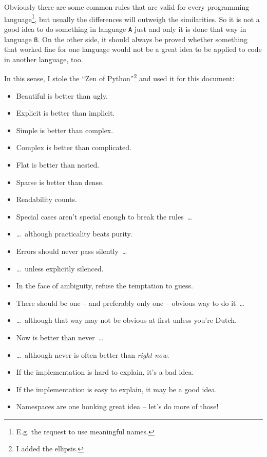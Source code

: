\documentclass[11pt,a4paper, titlepage, parskip=half, headsepline, footsepline, cleardoublepage=current, headheight=1cm]{scrbook}
\begin{document}
Obviously there are some common rules that are valid for every programming language\footnote{E.g. the request to use meaningful names.}, but usually the differences will outweigh the similarities. So it is not a good idea to do something in language \verb#A# just and only it is done that way in language \verb#B#. On the other side, it should always be proved whether something that worked fine for one language would not be a great idea to be applied to code in another language, too.

In this sense, I stole the “Zen of Python”\autocite{WIKIPEDIA:ZenOfPython,PYTHON_ORG_MAILING_LIST:ThePythonWay}\footnote{I added the ellipsis.} and used it for this document:

\begin{itemize}[nosep]
	\item Beautiful is better than ugly.
	\item Explicit is better than implicit.
	\item Simple is better than complex.
	\item Complex is better than complicated.
	\item Flat is better than nested.
	\item Sparse is better than dense.
	\item Readability counts.
	\item Special cases aren't special enough to break the rules~…
	\item …~although practicality beats purity.
	\item Errors should never pass silently~…
	\item …~unless explicitly silenced.
	\item In the face of ambiguity, refuse the temptation to guess.
	\item There should be one – and preferably only one – obvious way to do it~…
	\item …~although that way may not be obvious at first unless you're Dutch.
	\item Now is better than never~…
	\item …~although never is often better than \textit{right now}.
	\item If the implementation is hard to explain, it's a bad idea.
	\item If the implementation is easy to explain, it may be a good idea.
	\item Namespaces are one honking great idea – let's do more of those!
\end{itemize}
\end{document}
